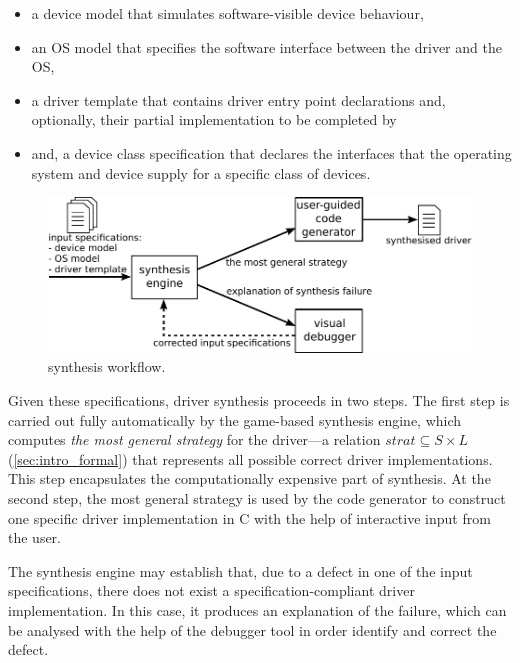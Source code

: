 \begin{itemize}
    \item a device model that simulates software-visible device behaviour, 
    \item an OS model that specifies the software interface between the driver and the OS, 
    \item a driver template that contains driver entry point declarations and, optionally, their partial implementation to be completed by \termite
    \item and, a device class specification that declares the interfaces that the operating system and device supply for a specific class of devices.
\end{itemize}

\begin{figure}
    \center
    \includegraphics[width=\linewidth]{imgs/termite.pdf}
    \caption{\termite synthesis workflow.}\label{f:termite}
\end{figure}

Given these specifications, driver synthesis proceeds in two steps.  The first step is carried out fully automatically by the \termite game-based synthesis engine, which computes \emph{the most general strategy} for the driver---a relation $strat \subseteq S \times L$ (\ref{sec:intro_formal}) that represents all possible correct driver implementations.  This step encapsulates the computationally expensive part of synthesis.  At the second step, the most general strategy is used by the \termite code generator to construct one specific driver implementation in C with the help of interactive input from the user.

The synthesis engine may establish that, due to a defect in one of the input specifications, there does not exist a specification-compliant driver implementation.  In this case, it produces an explanation of the failure, which can be analysed with the help of the \termite debugger tool in order identify and correct the defect.

        

